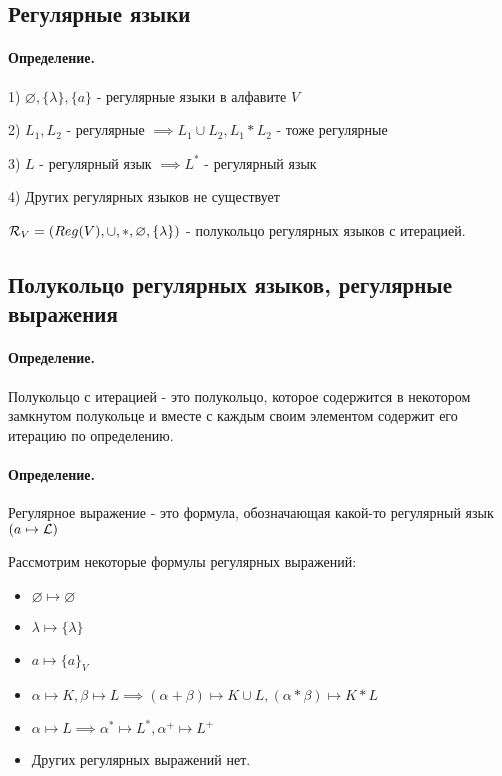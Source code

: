 \documentclass{report}
\begin{document}
\subsection{Регулярные языки}

\paragraph*{Определение.}
1) $\varnothing, \{\lambda\}, \{a\}  $ - регулярные языки в алфавите $V$

2) $L_1,L_2$ - регулярные $\implies L_1 \cup L_2, L_1*L_2$ - тоже регулярные

3) $L$ - регулярный язык  $\implies L^{*}$ - регулярный язык

4) Других регулярных языков не существует

\medskip

$ {\cal R}_{V} = (Reg(V), \cup, *, \varnothing, \{\lambda\} )$ - полукольцо
регулярных языков с итерацией.


\subsection{Полукольцо регулярных языков, регулярные выражения}
\paragraph*{Определение.}
Полукольцо с итерацией - это полукольцо, которое содержится в некотором замкнутом
полукольце и вместе с каждым своим элементом содержит его итерацию по определению.

\paragraph*{Определение.}
Регулярное выражение - это формула, обозначающая какой-то регулярный язык $(a \mapsto  {\cal L})$ 

Рассмотрим некоторые формулы регулярных выражений:
\begin{itemize}
	\item $\varnothing \mapsto \varnothing$
	\item $\lambda \mapsto \{\lambda\} $
 	\item $a \mapsto \{a\}_{V} $ 
	\item $\alpha \mapsto K, \beta \mapsto L \implies
		(\alpha + \beta) \mapsto K \cup L, (\alpha * \beta) \mapsto K*L$
	\item $\alpha \mapsto L \implies \alpha^{*} \mapsto L^{*},
		\alpha^{+} \mapsto L^{+}$ 
	\item Других регулярных выражений нет.
\end{itemize}
\end{document}
